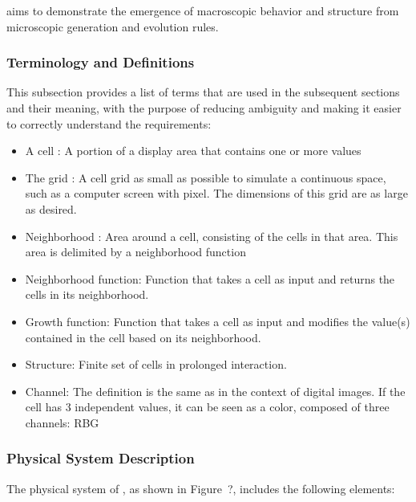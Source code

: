 \documentclass[12pt]{article}
\begin{document}
\progname{} aims to demonstrate the emergence of macroscopic behavior and structure from microscopic generation and evolution rules.

\subsubsection{Terminology and  Definitions}

This subsection provides a list of terms that are used in the subsequent
sections and their meaning, with the purpose of reducing ambiguity and making it
easier to correctly understand the requirements:

\begin{itemize}

\item A cell : A portion of a display area that contains one or more values

\item The grid : A cell grid as small as possible to simulate a continuous space, such as a computer screen with pixel. The dimensions of this grid are as large as desired.

\item Neighborhood : Area around a cell, consisting of the cells in that area. This area is delimited by a neighborhood function

\item Neighborhood function: Function that takes a cell as input and returns the cells in its neighborhood.

\item Growth function: Function that takes a cell as input and modifies the value(s) contained in the cell based on its neighborhood.

\item Structure: Finite set of cells in prolonged interaction.

\item Channel: The definition is the same as in the context of digital images. If the cell has 3 independent values, it can be seen as a color, composed of three channels: RBG


\end{itemize}

\subsubsection{Physical System Description} \label{sec_phySystDescrip}

The physical system of \progname{}, as shown in Figure~?, includes the following elements:
\end{document}

